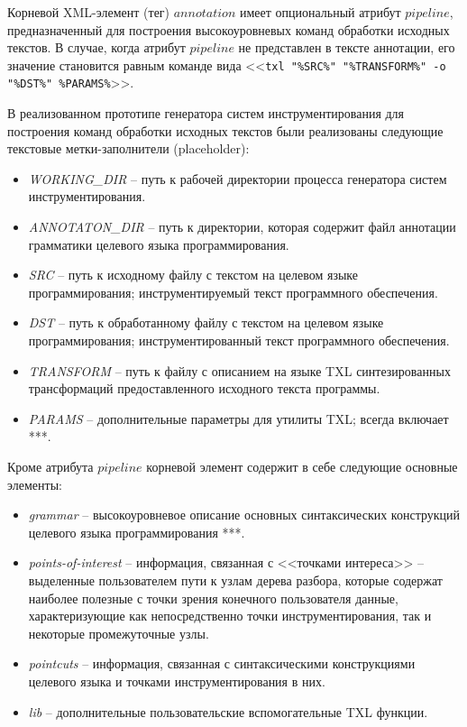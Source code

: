 Корневой XML-элемент (тег) $annotation$ имеет опциональный атрибут $pipeline$, предназначенный для построения высокоуровневых команд обработки исходных текстов.
В случае, когда атрибут $pipeline$ не представлен в тексте аннотации, его значение становится равным команде вида <<\lstinline{txl "%SRC%" "%TRANSFORM%" -o "%DST%" %PARAMS%}>>.

В реализованном прототипе генератора систем инструментирования для построения команд обработки исходных текстов были реализованы следующие текстовые метки-заполнители (placeholder):

\begin{itemize}[noitemsep]
  \item \textit{WORKING\_DIR}   -- путь к рабочей директории процесса генератора систем инструментирования.
  \item \textit{ANNOTATON\_DIR} -- путь к директории, которая содержит файл аннотации грамматики целевого языка программирования.
  \item \textit{SRC}            -- путь к исходному файлу с текстом на целевом языке программирования; инструментируемый текст программного обеспечения.
  \item \textit{DST}            -- путь к обработанному файлу с текстом на целевом языке программирования; инструментированный текст программного обеспечения.
  \item \textit{TRANSFORM}      -- путь к файлу с описанием на языке TXL синтезированных трансформаций предоставленного исходного текста программы.
  \item \textit{PARAMS}         -- дополнительные параметры для утилиты TXL; всегда включает ***.
\end{itemize}

Кроме атрибута $pipeline$ корневой элемент содержит в себе следующие основные элементы:

\begin{itemize}[noitemsep]
  \item \textit{grammar}            -- высокоуровневое описание основных синтаксических конструкций целевого языка программирования ***.
  \item \textit{points-of-interest} -- информация, связанная с <<точками интереса>> -- выделенные пользователем пути к узлам дерева разбора, которые содержат наиболее полезные с точки зрения конечного пользователя данные, характеризующие как непосредственно точки инструментирования, так и некоторые промежуточные узлы.
  \item \textit{pointcuts}          -- информация, связанная с синтаксическими конструкциями целевого языка и точками инструментирования в них.
  \item \textit{lib}                -- дополнительные пользовательские вспомогательные TXL функции.
\end{itemize}

